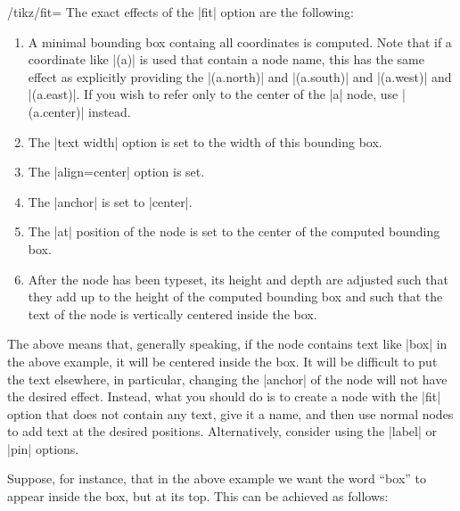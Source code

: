 \begin{key}{/tikz/fit=}
  The exact effects of the |fit| option are the following:
  \begin{enumerate}
  \item A minimal bounding box containg all coordinates is
    computed. Note that if a coordinate like |(a)| is used that
    contain a node name, this has the same effect as explicitly
    providing the |(a.north)| and |(a.south)| and |(a.west)| and
    |(a.east)|. If you wish to refer only to the center of the |a|
    node, use  |(a.center)| instead.
  \item The |text width| option is set to the width of this bounding box.
  \item The |align=center| option is set.
  \item The |anchor| is set to |center|.
  \item The |at| position of the node is set to the center of the
    computed bounding box.
  \item After the node has been typeset, its height and depth are
    adjusted such that they add up to the height of the computed
    bounding box and such that the text of the node is vertically
    centered inside the box.
  \end{enumerate}
  The above means that, generally speaking, if the node contains text
  like |box| in the above example, it will be centered inside the
  box. It will be difficult to put the text elsewhere, in particular,
  changing the |anchor| of the node will not have the desired
  effect. Instead, what you should do is to create a node with the
  |fit| option that does not contain any text, give it a name, and
  then use normal nodes to add text at the desired
  positions. Alternatively, consider using the |label| or |pin|
  options. 

  Suppose, for instance, that in the above example we want the word
  ``box'' to appear inside the box, but at its top. This can be
  achieved as follows: 
\begin{codeexample}[]
\end{codeexample}


\end{key}
